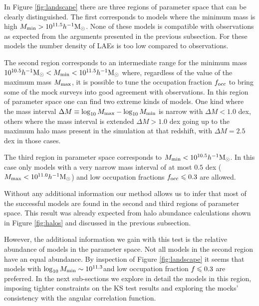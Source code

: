 \documentclass[usenatbib]{mn2e}
\newcommand{\hMsun}{{\ifmmode{h^{-1}{\rm
        {M_{\odot}}}}\else{$h^{-1}{\rm{M_{\odot}}}$}\fi}}
\begin{document}
In Figure \ref{fig:landscape} there are three regions of parameter
space that can be clearly distinguished. The first corresponds to
models where the minimum mass is high $M_{\rm min}>
10^{11.5}\hMsun$. None of these models is compatible with observations
as expected from the arguments presented in the previous
subsection. For these models the number density of LAEs is too low
compared to observations.

 
The second region corresponds to an intermediate range for the minimum
mass $10^{10.5}\hMsun < M_{\rm min}< 10^{11.5}\hMsun$ where,
regardless of the value of the maximum mass $M_{\rm max}$, it is
possible to tune the occupation fraction $f_{\rm occ}$ to bring some
of the mock surveys into good agreement with observations. In this
region of parameter space one can find two extreme kinds of models.
One kind where the mass interval $\Delta M\equiv \log_{10} M_{\rm max}
- \log_{10}M_{\rm  min}$ is narrow with $\Delta M<1.0$ dex, others
where the mass interval is  extended $\Delta M>1.0$ dex going up to
the maximum halo mass present in the simulation at that redshift, with
$\Delta M = 2.5$ dex in those cases.
 
The third region in parameter space corresponds to $M_{\rm
  min}<10^{10.5}\hMsun$. In this case only models with a very narrow
mass interval of at most $0.5$ dex ($M_{\rm max}<10^{11.0}\hMsun$) and low
occupation fractions $f_{\rm occ}\leq 0.3$ are allowed. 

Without any additional information our method allows us to infer that
most of the successful models are found in the second and third regions of
parameter space. This result was already expected from halo
abundance calculations shown in Figure \ref{fig:halos} and discussed
in the previous subsection. 

However, the additional information we gain with this test is the
relative abundance of models in the parameter space. Not all 
models in the second region have an equal abundance. By inspection of
Figure \ref{fig:landscape} it seems that models with $\log_{10}M_{\rm
  min}\sim 10^{11.3}$\hMsun and low occupation fraction $f_{\rm}\leq 0.3$
are preferred.  In the next sub-sections we explore in detail the
models in this region, imposing tighter constraints on the KS test
results and exploring the mocks' consistency with the angular correlation
function.  
\end{document}
